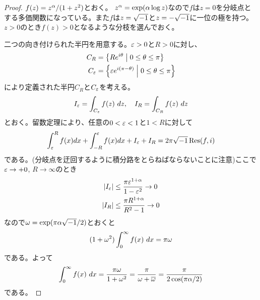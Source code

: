 \subsubsection{}%
\begin{proof}
  $f(z) = z^{{\alpha}}/ (1 + z^2)$とおく。
  $z^{{\alpha}} = \exp( {\alpha} \log z )$なので$f$は$z=0$を分岐点とする多価関数になっている。また$f$は$z=\sqrt{-1}$と$z=- \sqrt{-1}$に一位の極を持つ。$z > 0$のとき$f(z) > 0$となるような分枝を選んでおく。

  二つの向き付けられた半円を用意する。${\varepsilon}>0$と$R>0$に対し、
  \begin{align*}
    C_R &= \left\{  R e^{i {\theta}}  \mathrel{} \middle| \mathrel{}  0 \leq {\theta} \leq \pi   \right\} \\
    C_{{\varepsilon}} &= \left\{  {\varepsilon} e^{i (\pi - {\theta})}  \mathrel{} \middle| \mathrel{}  0 \leq {\theta} \leq \pi   \right\}
  \end{align*}
  により定義された半円$C_R$と$C_{{\varepsilon}}$を考える。
\[
I_{{\varepsilon}} = \int_{C_{{\varepsilon}}} f(z) \ dz , \quad I_{R} = \int_{C_{R}} f(z) \ dz
\]
とおく。留数定理により、任意の$0 < {\varepsilon} < 1$と$1 < R$に対して
\[
 \int_{{\varepsilon}}^R f(x) dx + \int_{-R}^{{\varepsilon}} f(x) dx + I_{{\varepsilon}} + I_{R} = 2\pi \sqrt{-1} \operatorname{Res}(f,i)
\]
である。(分岐点を迂回するように積分路をとらねばならないことに注意)ここで${\varepsilon} \to + 0$, $R \to \infty$のとき
\begin{align*}
  \left \lvert  I_{{\varepsilon}} \right \rvert &\leq \frac{ \pi {\varepsilon}^{1+{\alpha}} }{ 1 - {\varepsilon}^2 } \to 0 \\
    \left \lvert  I_{R} \right \rvert &\leq \frac{ \pi R^{1+{\alpha}} }{ R^2 - 1 } \to 0
\end{align*}
なので${\omega} = \exp(\pi {\alpha} \sqrt{-1} / 2)$とおくと
\[
(1 + {\omega}^2) \int_0^{\infty} f(x) \ dx = \pi {\omega}
\]
である。よって
\[
\int_0^{\infty} f(x) \ dx = \frac{\pi {\omega}}{1 + {\omega}^2} = \frac{ \pi }{ {\omega} + \overline{{\omega}} } = \frac{\pi}{2 \cos(\pi {\alpha} /2)}
\]
である。
\end{proof}

\newpage


